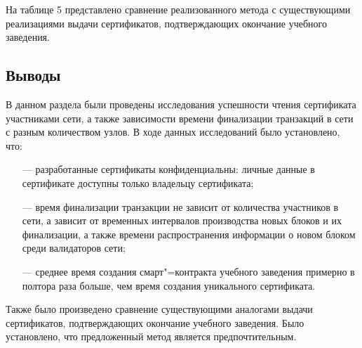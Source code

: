 На таблице 5 представлено сравнение реализованного метода с существующими реализациями выдачи сертификатов, подтверждающих окончание учебного заведения.
\begin{table}[h!]
	\captionsetup{justification=raggedleft,singlelinecheck=off}
	\caption{Сравнение реализованного метода с аналогами}
\end{table}


\subsection*{Выводы}

В данном раздела были проведены исследования успешности чтения сертификата участниками сети, а также зависимости времени финализации транзакций в сети с разным количеством узлов. В ходе данных исследований было установлено, что:
\begin{itemize}[leftmargin=1.6\parindent]
	\item[---] разработанные сертификаты конфиденциальны: личные данные в сертификате доступны только владельцу сертификата;
	\item[---] время финализации транзакции не зависит от количества участников в сети, а зависит от временных интервалов производства новых блоков и их финализации, а также времени распространения информации о новом блоком среди валидаторов сети;
	\item[---] среднее время создания смарт"=контракта учебного заведения примерно в полтора раза больше, чем время создания уникального сертификата.
\end{itemize} 

Также было произведено сравнение существующими аналогами выдачи сертификатов, подтверждающих окончание учебного заведения. Было установлено, что предложенный метод является предпочтительным.


\pagebreak